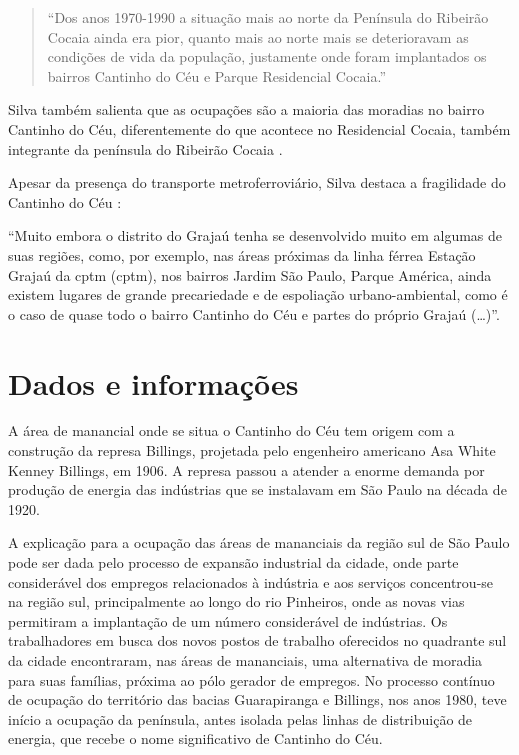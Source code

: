 	\begin{quote}
		``Dos anos 1970-1990 a situação mais ao norte da Península do Ribeirão Cocaia ainda era pior, quanto mais ao norte mais se deterioravam as condições de vida da população, justamente onde foram implantados os bairros Cantinho do Céu e Parque Residencial Cocaia.''
	\end{quote}
	
	Silva também salienta que as ocupações são a maioria das moradias no bairro Cantinho do Céu, diferentemente do que acontece no Residencial Cocaia, também integrante da península do Ribeirão Cocaia \cite[p.83]{Silva2016}.
	
	Apesar da presença do transporte metroferroviário, Silva destaca a fragilidade do Cantinho do Céu \cite[p.98]{Silva2016}:
	
	\begin{citacao}
		``Muito embora o distrito do Grajaú tenha se desenvolvido muito em algumas de suas regiões, como, por exemplo, nas áreas próximas da linha férrea Estação Grajaú da \glsdesc{cptm} (\gls{cptm}), nos bairros Jardim São Paulo, Parque América, ainda existem lugares de grande	precariedade e de espoliação urbano-ambiental, como é o caso de quase todo o bairro Cantinho do Céu e partes do próprio Grajaú (\dots)''.
	\end{citacao}
	
	\section{Dados e informações}
	
	A área de manancial onde se situa o Cantinho do Céu tem origem com a construção da represa Billings, projetada pelo engenheiro americano Asa White Kenney Billings, em 1906. A represa passou a atender a enorme demanda por produção de energia das indústrias que se instalavam em São Paulo na década de 1920.
	
	A explicação para a ocupação das áreas de mananciais da região sul de São Paulo pode ser dada pelo processo de expansão industrial da cidade, onde parte considerável dos empregos relacionados à indústria e aos serviços concentrou-se na região sul, principalmente ao longo do rio Pinheiros, onde as novas vias permitiram a implantação de um número considerável de indústrias. Os trabalhadores em busca dos novos postos de trabalho oferecidos no quadrante sul da cidade encontraram, nas áreas de mananciais, uma alternativa de moradia para suas famílias, próxima ao pólo gerador de empregos. No processo contínuo de ocupação do território das bacias Guarapiranga e Billings, nos anos 1980, teve início a ocupação da península, antes isolada pelas linhas de distribuição de energia, que recebe o nome significativo de Cantinho do Céu.
	
